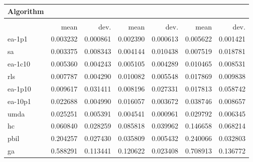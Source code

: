 \begin{tabular}{@{} l *{6}{>{{}}N{1}{2}} @{}}
\toprule
{Algorithm} &  \\
\midrule
&  &  &  \\
\midrule
& {mean} & {dev.} & {mean} & {dev.} & {mean} & {dev.} \\
\midrule
ea-1p1 & 0.003232 & 0.000861 & 0.002390 & 0.000613 & 0.005622 & 0.001421 \\
sa & 0.003375 & 0.008343 & 0.004144 & 0.010438 & 0.007519 & 0.018781 \\
ea-1c10 & 0.005360 & 0.004243 & 0.005105 & 0.004289 & 0.010465 & 0.008531 \\
rls & 0.007787 & 0.004290 & 0.010082 & 0.005548 & 0.017869 & 0.009838 \\
ea-1p10 & 0.009617 & 0.031411 & 0.008196 & 0.027331 & 0.017813 & 0.058742 \\
ea-10p1 & 0.022688 & 0.004990 & 0.016057 & 0.003672 & 0.038746 & 0.008657 \\
umda & 0.025251 & 0.005391 & 0.004541 & 0.000961 & 0.029792 & 0.006345 \\
hc & 0.060840 & 0.028259 & 0.085818 & 0.039962 & 0.146658 & 0.068214 \\
pbil & 0.204257 & 0.027430 & 0.035809 & 0.005432 & 0.240066 & 0.032803 \\
ga & 0.588291 & 0.113441 & 0.120622 & 0.023408 & 0.708913 & 0.136772 \\
\bottomrule
\end{tabular}
